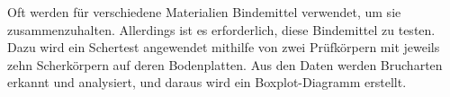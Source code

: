 
Oft werden für verschiedene Materialien Bindemittel verwendet, um sie zusammenzuhalten. 
Allerdings ist es erforderlich, diese Bindemittel zu testen. 
Dazu wird ein Schertest angewendet mithilfe von zwei Prüfkörpern mit jeweils zehn Scherkörpern auf deren Bodenplatten.
Aus den Daten werden Brucharten erkannt und analysiert, und daraus wird ein Boxplot-Diagramm erstellt.